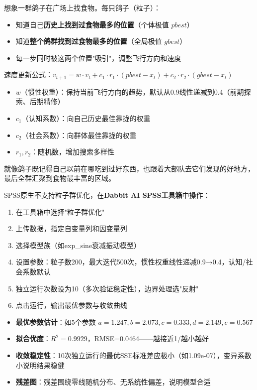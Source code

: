 \begin{algoprinciple}
想象一群鸽子在广场上找食物。每只鸽子（粒子）：

\begin{itemize}
    \item 知道自己\textbf{历史上找到过食物最多的位置}（个体极值 $pbest$）
    \item 知道\textbf{整个鸽群找到过食物最多的位置}（全局极值 $gbest$）
    \item 每一步同时被这两个位置"吸引"，调整飞行方向和速度
\end{itemize}

速度更新公式：$v_{t+1} = w\cdot v_t + c_1\cdot r_1\cdot(pbest-x_t) + c_2\cdot r_2\cdot(gbest-x_t)$

\begin{itemize}
    \item $w$（惯性权重）：保持当前飞行方向的趋势，默认从0.9线性递减到0.4（前期探索、后期精修）
    \item $c_1$（认知系数）：向自己历史最佳靠拢的权重
    \item $c_2$（社会系数）：向群体最佳靠拢的权重
    \item $r_1, r_2$：随机数，增加搜索多样性
\end{itemize}

就像鸽子既记得自己以前在哪吃到过好东西，也跟着大部队去它们发现的好地方，最后全群汇聚到食物最丰富的区域。
\end{algoprinciple}

\begin{algosposs}
SPSS原生不支持粒子群优化，在\textbf{Dabbit AI SPSS工具箱}中操作：

\begin{enumerate}
    \item 在工具箱中选择"粒子群优化"
    \item 上传数据，指定自变量列和因变量列
    \item 选择模型族（如exp\_sine衰减振动模型）
    \item 设置参数：粒子数200，最大迭代500次，惯性权重线性递减0.9→0.4，认知/社会系数默认
    \item 独立运行次数设为10（多次验证稳定性），边界处理选"反射"
    \item 点击运行，输出最优参数与收敛曲线
\end{enumerate}
\end{algosposs}

\begin{algoresult}
\begin{itemize}
    \item \textbf{最优参数估计}：如5个参数 $a=1.247, b=2.073, c=0.333, d=2.149, e=0.567$
    \item \textbf{拟合优度}：$R^2=0.9929$，RMSE=0.0464——越接近1/越小越好
    \item \textbf{收敛稳定性}：10次独立运行的最优SSE标准差应极小（如1.09e-07），变异系数小说明结果稳健
    \item \textbf{残差图}：残差围绕零线随机分布、无系统性偏差，说明模型合适
\end{itemize}
\end{algoresult}

